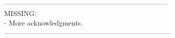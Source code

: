\documentclass{latex/emulateapj}
\begin{document}
---------------------------------------------------------------------\\
MISSING: \\
- More acknowledgments.\\
-----------------------------------------------------------------------\\




\newpage

%
%
%
%
\end{document}
